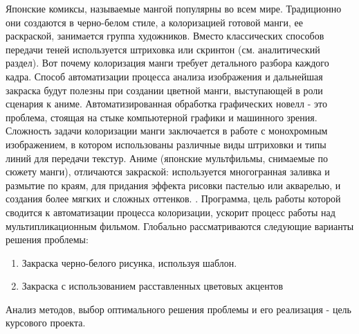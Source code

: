 \Introduction

Японские комиксы, называемые мангой популярны во всем мире. Традиционно
они создаются в черно-белом стиле, а колоризацией готовой манги, ее раскраской,
занимается группа художников. Вместо классических способов передачи теней
используется штриховка или скринтон (см. аналитический раздел). Вот почему колоризация
манги требует детального разбора каждого кадра. Способ автоматизации
процесса анализа изображения и дальнейшая закраска будут полезны при создании
цветной манги, выступающей в роли сценария к аниме.
Автоматизированная обработка графических новелл - это проблема, стоящая
на стыке компьютерной графики и машинного зрения. Сложность задачи колоризации
манги заключается в работе с монохромным изображением, в котором
использованы различные виды штриховки и типы линий для передачи текстур. Аниме
(японские мультфильмы, снимаемые по сюжету манги), отличаются закраской:
используется многогранная заливка и размытие по краям, для придания эффекта
рисовки пастелью или акварелью, и создания более мягких и сложных оттенков. .
Программа, цель работы которой сводится к автоматизации процесса колоризации,
ускорит процесс работы над мультипликационным фильмом.
Глобально рассматриваются следующие варианты решения проблемы:

\begin{enumerate}
\item Закраска черно-белого рисунка, используя шаблон.
\item Закраска с использованием расставленных цветовых акцентов
\end{enumerate}

Анализ методов, выбор оптимального решения проблемы и его реализация -
цель курсового проекта.
 
  
 
 
 

